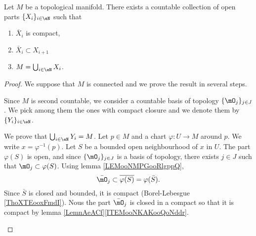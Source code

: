 \begin{lemma}		\label{LEMooDHIHooQtAWUJ}
	Let \( M\) be a topological manifold. There exists a countable collection of open parts \( \{ X_i \}_{i\in \eN}\) such that
	\begin{enumerate}
		\item
		      \( \bar X_i\) is compact,
		\item
		      \( \bar X_i\subset X_{i+1}\)
		\item
		      \( M=\bigcup_{i\in \eN}X_i\).
	\end{enumerate}
\end{lemma}

\begin{proof}
	We suppose that \( M\) is connected and we prove the result in several steps.
	\begin{subproof}
		Since \( M\) is second countable, we consider a countable basis of topology \( \{ \mO_j \}_{j\in J}\). We pick among them the ones with compact closure and we denote them by \( \{ Y_i \}_{i\in \eN}\).

		\spitem[\( Y_i\) covers \( M\)]
		We prove that \( \bigcup_{i\in \eN}Y_i=M\). Let \( p\in M\) and a chart \(\varphi \colon U\to M  \) around \( p\). We write \( x=\varphi^{-1}(p)\). Let \( S\) be a bounded open neighbourhood of \( x\) in \( U\). The part \( \varphi(S)\) is open, and since \( \{ \mO_j \}_{j\in J}\) is a basis of topology, there exists \( j\in J\) such that \( \mO_j\subset\varphi(S)\). Using lemma \ref{LEMooNMPGooRlgppQ},
		\begin{equation}
			\bar\mO_j\subset\overline{\varphi(S)}=\varphi(\bar S).
		\end{equation}
		Since \( \bar S\) is closed and bounded, it is compact (Borel-Lebesgue \ref{ThoXTEooxFmdI}). Nous the part \( \bar\mO_j\) is closed in a compact so that it is compact by lemma \ref{LemnAeACf}\ref{ITEMooNKAKooQoNddr}.


\end{subproof}
\end{proof}
